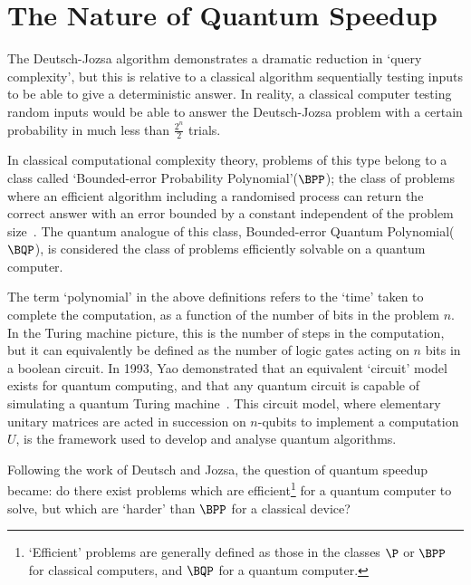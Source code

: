 \documentclass{standalone}
\begin{document}
\section{The Nature of Quantum Speedup}\label{sec:WhatSpeedup}
The Deutsch-Jozsa algorithm demonstrates a dramatic reduction in `query complexity', but this is relative to a classical algorithm sequentially testing inputs to be able to give a deterministic answer. In reality, a classical computer testing random inputs would be able to answer the Deutsch-Jozsa problem with a certain probability in much less than $\frac{2^{n}}{2}$ trials. 
\par
In classical computational complexity theory, problems of this type belong to a class called `Bounded-error Probability Polynomial'($\BPP$); the class of problems where an efficient algorithm including a randomised process can return the correct answer with an error bounded by a constant independent of the problem size~\cite{Bennett1997}. The quantum analogue of this class, Bounded-error Quantum Polynomial($\BQP$), is considered the class of problems efficiently solvable on a quantum computer.
\par
The term `polynomial' in the above definitions refers to the `time' taken to complete the computation, as a function of the number of bits in the problem $n$. In the Turing machine picture, this is the number of steps in the computation, but it can equivalently be defined as the number of logic gates acting on $n$ bits in a boolean circuit. In 1993, Yao demonstrated that an equivalent `circuit' model exists for quantum computing, and that any quantum circuit is capable of simulating a quantum Turing machine~\cite{Yao1993}. This circuit model, where elementary unitary matrices are acted in succession on $n$-qubits to implement a computation $U$, is the framework used to develop and analyse quantum algorithms. 
\par
Following the work of Deutsch and Jozsa, the question of quantum speedup became: do there exist problems which are efficient\footnote{`Efficient' problems are generally defined as those in the classes $\P$ or $\BPP$ for classical computers, and $\BQP$ for a quantum computer.} for a quantum computer to solve, but which are `harder' than $\BPP$ for a classical device?
\par
\end{document}
